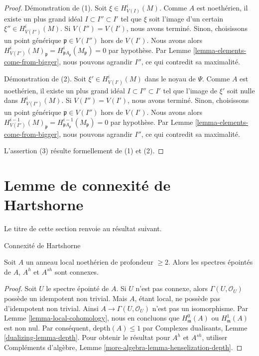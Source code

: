 \begin{proof}
Démonstration de (1).
Soit $\xi \in H^i_{V(I)}(M)$. Comme $A$ est noethérien, il existe un
plus grand idéal $I \subset I'' \subset I'$ tel que $\xi$ soit l'image
d'un certain $\xi'' \in H^i_{V(I'')}(M)$. Si $V(I'') = V(I')$, nous avons
terminé. Sinon, choisissons un point générique $\mathfrak p \in V(I'')$ hors de $V(I')$.
Nous avons alors $H^i_{V(I'')}(M)_\mathfrak p =
H^i_{\mathfrak pA_\mathfrak p}(M_\mathfrak p) = 0$ par hypothèse.
Par Lemme \ref{lemma-elements-come-from-bigger}, nous pouvons agrandir $I''$,
ce qui contredit sa maximalité.

\medskip\noindent
Démonstration de (2). Soit $\xi' \in H^i_{V(I')}(M)$ dans le noyau de $\Psi$.
Comme $A$ est noethérien, il existe un
plus grand idéal $I \subset I'' \subset I'$ tel que l'image de $\xi'$
soit nulle dans $H^i_{V(I'')}(M)$. Si $V(I'') = V(I')$, nous avons
terminé. Sinon, choisissons un point générique $\mathfrak p  \in V(I'')$
hors de $V(I')$. Nous avons alors $H^{i - 1}_{V(I'')}(M)_\mathfrak p =
H^{i - 1}_{\mathfrak pA_\mathfrak p}(M_\mathfrak p) = 0$ par hypothèse.
Par Lemme \ref{lemma-elements-come-from-bigger}, nous pouvons agrandir $I''$,
ce qui contredit sa maximalité.

\medskip\noindent
L'assertion (3) résulte formellement de (1) et (2).
\end{proof}





\section{Lemme de connexité de Hartshorne}
\label{section-hartshorne-connectedness}

\noindent
Le titre de cette section renvoie au résultat suivant.

\begin{lemma}
\label{lemma-depth-2-connected-punctured-spectrum}
\begin{reference}
\cite[Proposition 2.1]{Hartshorne-connectedness}
\end{reference}
\begin{slogan}
Connexité de Hartshorne
\end{slogan}
Soit $A$ un anneau local noethérien de profondeur $\geq 2$.
Alors les spectres épointés de $A$, $A^h$ et $A^{sh}$ sont connexes.
\end{lemma}

\begin{proof}
Soit $U$ le spectre épointé de $A$.
Si $U$ n'est pas connexe, alors
$\Gamma(U, \mathcal{O}_U)$ possède un idempotent non trivial.
Mais $A$, étant local, ne possède pas d'idempotent non trivial.
Ainsi $A \to \Gamma(U, \mathcal{O}_U)$ n'est pas un isomorphisme.
Par Lemme \ref{lemma-local-cohomology},
nous en concluons que $H^0_\mathfrak m(A)$ ou $H^1_\mathfrak m(A)$
est non nul. Par conséquent, $\text{depth}(A) \leq 1$ par
Complexes dualisants, Lemme \ref{dualizing-lemma-depth}.
Pour obtenir le résultat pour $A^h$ et $A^{sh}$, utiliser
Compléments d'algèbre, Lemme \ref{more-algebra-lemma-henselization-depth}.
\end{proof}

